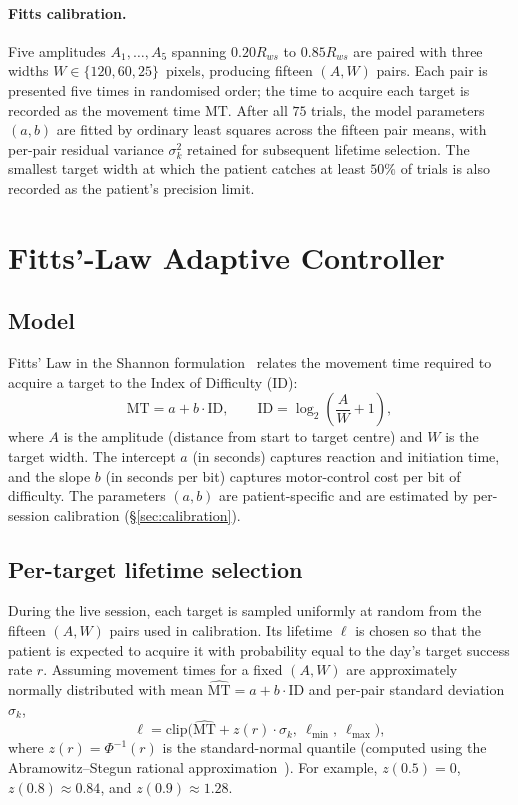 \documentclass[11pt,a4paper]{article}
\begin{document}
\paragraph{Fitts calibration.}
Five amplitudes $A_1, \ldots, A_5$ spanning $0.20 R_{ws}$ to $0.85 R_{ws}$ are paired with three widths $W \in \{120, 60, 25\}$~pixels, producing fifteen $(A, W)$ pairs. Each pair is presented five times in randomised order; the time to acquire each target is recorded as the movement time $\text{MT}$. After all $75$ trials, the model parameters $(a, b)$ are fitted by ordinary least squares across the fifteen pair means, with per-pair residual variance $\sigma_k^2$ retained for subsequent lifetime selection. The smallest target width at which the patient catches at least $50\%$ of trials is also recorded as the patient's precision limit.

\section{Fitts'-Law Adaptive Controller}

\subsection{Model}

Fitts' Law in the Shannon formulation~\cite{mackenzie1992fitts} relates the movement time required to acquire a target to the Index of Difficulty (ID):
\begin{equation}
    \text{MT} = a + b \cdot \text{ID}, \qquad \text{ID} = \log_2\!\left(\frac{A}{W} + 1\right),
\end{equation}
where $A$ is the amplitude (distance from start to target centre) and $W$ is the target width. The intercept $a$ (in seconds) captures reaction and initiation time, and the slope $b$ (in seconds per bit) captures motor-control cost per bit of difficulty. The parameters $(a, b)$ are patient-specific and are estimated by per-session calibration (\S\ref{sec:calibration}).

\subsection{Per-target lifetime selection}

During the live session, each target is sampled uniformly at random from the fifteen $(A, W)$ pairs used in calibration. Its lifetime $\ell$ is chosen so that the patient is expected to acquire it with probability equal to the day's target success rate $r$. Assuming movement times for a fixed $(A, W)$ are approximately normally distributed with mean $\widehat{\text{MT}} = a + b \cdot \text{ID}$ and per-pair standard deviation $\sigma_k$,
\begin{equation}
    \ell = \mathrm{clip}\bigl(\widehat{\text{MT}} + z(r) \cdot \sigma_k,\ \ell_{\min},\ \ell_{\max}\bigr),
\end{equation}
where $z(r) = \Phi^{-1}(r)$ is the standard-normal quantile (computed using the Abramowitz--Stegun rational approximation~\cite{abramowitz1964}). For example, $z(0.5) = 0$, $z(0.8) \approx 0.84$, and $z(0.9) \approx 1.28$.
\end{document}
